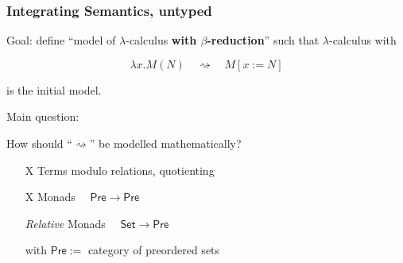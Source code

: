 \documentclass[
serif,
mathsans,
]
{beamer}
\newcommand{\Set}{\mathsf{Set}}
\newcommand{\PreOrd}{\mathsf{Pre}}
\begin{document}
\begin{frame}
 \tableofcontents[currentsection]
\end{frame}










\begin{frame}
 \frametitle{Integrating Semantics, untyped}


\begin{block}{Goal: define ``model of $\lambda$-calculus \textbf{with $\beta$-reduction}''}
     such that $\lambda$-calculus with 

             \[   \lambda x . M(N) \quad \rightsquigarrow \quad M [x:=N] \]
             
 is the initial model.
 \end{block}
   
   
  \begin{block}{Main question:}
   
   How should ``$\rightsquigarrow$'' be modelled mathematically?
   
  \begin{itemize}
   \item[\alert{X}] Terms modulo relations, quotienting 
   \item[\alert{X}] Monads $\quad \PreOrd \to \PreOrd$  
   \item[\checkmark] \emph{Relative} Monads $\quad\Set \to \PreOrd$ 
   \item [] with $\PreOrd :=$ category of preordered sets
  \end{itemize}

  \end{block}

  \end{frame}
  
\end{document}
